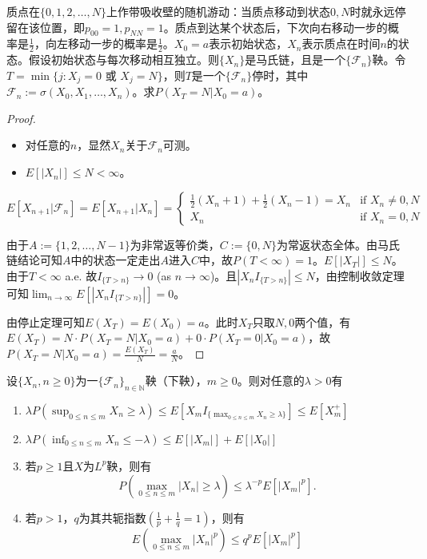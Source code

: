 \documentclass[lang=cn,10pt,thmcnt=section]{elegantbook}
\begin{document}
\begin{example}
	质点在$\{0, 1, 2, \ldots, N\}$上作带吸收壁的随机游动：当质点移动到状态$0, N$时就永远停留在该位置，即$p_{00} = 1, p_{NN} = 1$。质点到达某个状态后，下次向右移动一步的概率是$\frac{1}{2}$，向左移动一步的概率是$\frac{1}{2}$。$X_0 = a$表示初始状态，$X_n$表示质点在时间$n$的状态。假设初始状态与每次移动相互独立。则$\{X_n\}$是马氏链，且是一个$\{\mathcal{F}_n\}$鞅。令$T = \min\{j: X_j = 0 \text{ 或 } X_j = N\}$，则$T$是一个$\{\mathcal{F}_n\}$停时，其中$\mathcal{F}_n := \sigma(X_0, X_1, \ldots, X_n)$。求$P(X_T = N | X_0 = a)$。
\end{example}
\begin{proof}
	\begin{itemize}
		\item 对任意的$n$，显然$X_n$关于$\mathcal{F}_n$可测。
		\item $E[|X_n|] \leq N < \infty$。
	\end{itemize}
	\[
	E[X_{n+1} | \mathcal{F}_n] = E[X_{n+1} | X_n] = 
	\begin{cases} 
	\frac{1}{2}(X_n + 1) + \frac{1}{2}(X_n - 1) = X_n & \text{if } X_n \neq 0, N \\
	X_n & \text{if } X_n = 0, N 
	\end{cases}
	\]
	
	由于$A := \{1, 2, \ldots, N-1\}$为非常返等价类，$C := \{0, N\}$为常返状态全体。由马氏链结论可知$A$中的状态一定走出$A$进入$C$中，故$P(T < \infty) = 1$。$E[|X_T|] \leq N$。由于$T < \infty$ a.e. 故$I_{\{T > n\}} \rightarrow 0$ (as $n \rightarrow \infty$)。且$|X_n I_{\{T > n\}}| \leq N$，由控制收敛定理可知$\lim_{n \to \infty} E[|X_n I_{\{T > n\}}|] = 0$。
	
	由停止定理可知$E(X_T) = E(X_0) = a$。此时$X_T$只取$N, 0$两个值，有$E(X_T) = N \cdot P(X_T = N | X_0 = a) + 0 \cdot P(X_T = 0 | X_0 = a)$，故$P(X_T = N | X_0 = a) = \frac{E(X_T)}{N} = \frac{a}{N}$。
\end{proof}
\begin{theorem}
	设$\{X_n, n \geq 0\}$为一$\{\mathcal{F}_n\}_{n \in \mathbb{N}}$鞅（下鞅），$m \geq 0$。则对任意的$\lambda > 0$有
\begin{enumerate}
    \item $\lambda P(\sup_{0 \leq n \leq m} X_n \geq \lambda) \leq E[X_m I_{\{\max_{0 \leq n \leq m} X_n \geq \lambda\}}] \leq E[X_m^+]$
    \item $\lambda P(\inf_{0 \leq n \leq m} X_n \leq -\lambda) \leq E[|X_m|] + E[|X_0|]$
    \item 若$p \geq 1$且$X$为$L^p$鞅，则有
    \[
    P(\max_{0 \leq n \leq m} |X_n| \geq \lambda) \leq \lambda^{-p} E[|X_m|^p].
    \]
    \item 若$p > 1$，$q$为其共轭指数$(\frac{1}{p} + \frac{1}{q} = 1)$，则有
    \[
    E(\max_{0 \leq n \leq m} |X_n|^p) \leq q^p E[|X_m|^p]
    \]
\end{enumerate}
\end{theorem}
\end{document}
